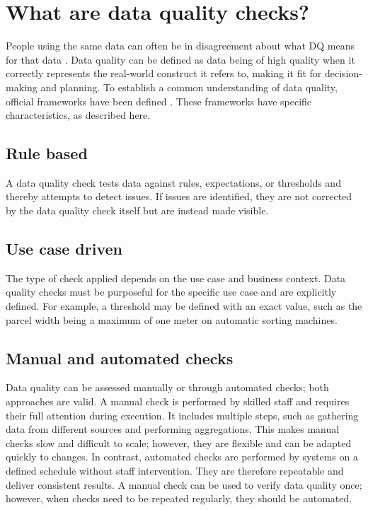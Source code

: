 



\section{What are data quality checks?}
\label{ResearchWhatIsDQ}
People using the same data can often be in disagreement about what \gls{DQ} means for that data \cite{DQwikipedia}. Data quality can be defined as data being of high quality when it correctly represents the real-world construct it refers to, making it fit for decision-making and planning. To establish a common understanding of data quality, official frameworks have been defined \cite{enwikiISO8000}. These frameworks have specific characteristics, as described here.

\subsection*{Rule based}
A data quality check tests data against rules, expectations, or thresholds and thereby attempts to detect issues. If issues are identified, they are not corrected by the data quality check itself but are instead made visible.

\subsection*{Use case driven}
The type of check applied depends on the use case and business context. Data quality checks must be purposeful for the specific use case and are explicitly defined. For example, a threshold may be defined with an exact value, such as the parcel width being a maximum of one meter on automatic sorting machines.

\subsection*{Manual and automated checks}
Data quality can be assessed manually or through automated checks; both approaches are valid. A manual check is performed by skilled staff and requires their full attention during execution. It includes multiple steps, such as gathering data from different sources and performing aggregations. This makes manual checks slow and difficult to scale; however, they are flexible and can be adapted quickly to changes. In contrast, automated checks are performed by systems on a defined schedule without staff intervention. They are therefore repeatable and deliver consistent results. A manual check can be used to verify data quality once; however, when checks need to be repeated regularly, they should be automated.

